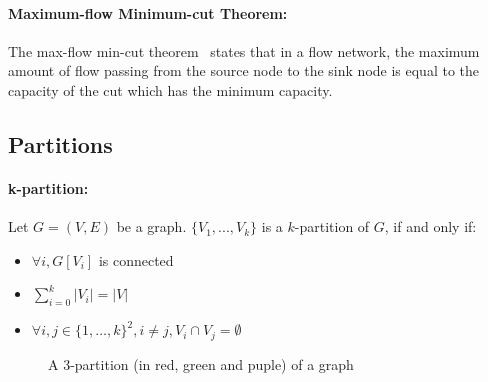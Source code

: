\paragraph{Maximum-flow Minimum-cut Theorem:}
The max-flow min-cut theorem~\cite{FD55} states that in a flow network, the maximum amount
of flow passing from the source node to the sink node is equal to the capacity
of the cut which has the minimum capacity.

\subsection{Partitions}
\paragraph{k-partition:}
Let $G = (V,E)$ be a graph.  $\{V_1,...,V_k\}$ is a $k$-partition of $G$, if
and only if:
\begin{itemize}
    \item $\forall i, G[V_i]$ is connected
    \item $\sum\limits_{i=0}^k|V_i| = |V|$
    \item $\forall i,j \in \{1, \dots, k\}^2, i \neq j, V_i \cap V_j = \emptyset$
\end{itemize}

\begin{figure}[!h]
    \caption{A 3-partition (in red, green and puple) of a graph}
    \begin{center}
        
    \end{center}
\end{figure}

